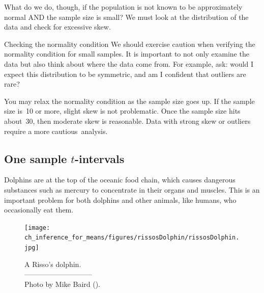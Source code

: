 What do we do, though, if the population is not known to be approximately normal AND the sample size is small?  We must look at the distribution of the data and check for excessive skew.

\begin{caution}{Checking the normality condition}
{We should exercise caution when verifying the normality condition for small samples. It is important to not only examine the data but also think about where the data come from. For example, ask: would I expect this distribution to be symmetric, and am I confident that outliers are rare?}
\end{caution}

You may relax the normality condition as the sample size goes up. If the sample size is~10 or more, slight skew is not problematic. Once the sample size hits about~30, then moderate skew is reasonable. Data with strong skew or outliers require a more \mbox{cautious analysis.}


\subsection{One sample $t$-intervals}
\label{oneSampleTConfidenceIntervals}

Dolphins are at the top of the oceanic food chain, which causes dangerous substances such as mercury to concentrate in their organs and muscles. This is an important problem for both dolphins and other animals, like humans, who occasionally eat them.
\setlength{\captionwidth}{71.5mm}

\begin{figure}[h]
\centering
\texttt{[image: ch\_inference\_for\_means/figures/rissosDolphin/rissosDolphin.jpg]}  \\
\addvspace{2mm}
\begin{minipage}{\textwidth}
   \caption[rissosDolphinPic]{A Risso's dolphin.\vspace{-1mm} \\
   -----------------------------\vspace{-2mm}\\
   {\footnotesize Photo by Mike Baird ().%
}\vspace{-8mm}}
   \label{rissosDolphin}
\end{minipage}
\vspace{3mm}
\end{figure}
\setlength{\captionwidth}{\mycaptionwidth}

